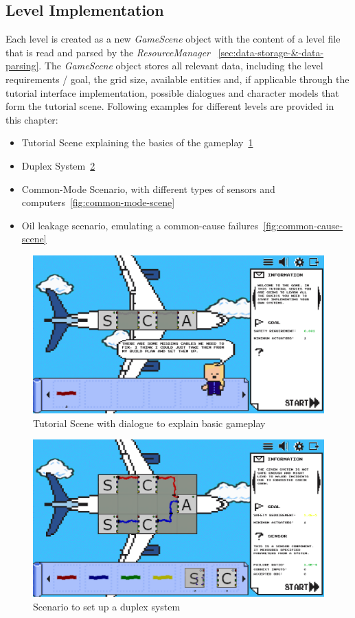 \subsection{Level Implementation}\label{subsec:level-implementation}
Each level is created as a new \textit{GameScene} object with the content of a level file that is read and parsed by the \textit{ResourceManager}
~\ref{sec:data-storage-&-data-parsing}.
The \textit{GameScene} object stores all relevant data, including the level requirements / goal, the grid size, available entities and,
if applicable through the
tutorial interface implementation, possible dialogues and character models that form the tutorial scene.
Following examples for different levels are provided in this chapter:
\begin{itemize}
    \item Tutorial Scene explaining the basics of the gameplay~\ref{fig:basic-gameplay-tutorial}
    \item Duplex System~\ref{fig:duplex-system}
    \item Common-Mode Scenario, with different types of sensors and computers~\ref{fig:common-mode-scene}
    \item Oil leakage scenario, emulating a common-cause failures~\ref{fig:common-cause-scene}
\end{itemize}
\begin{figure}
    \centering
    \includegraphics[width=\textwidth]{Pictures/res/implementation/scenes/tutorial-game-scene}
    \caption{Tutorial Scene with dialogue to explain basic gameplay}
    \label{fig:basic-gameplay-tutorial}
\end{figure}
\begin{figure}
    \centering
    \includegraphics[width=\textwidth]{Pictures/res/implementation/scenes/duplex-scene}
    \caption{Scenario to set up a duplex system}
    \label{fig:duplex-system}
\end{figure}
